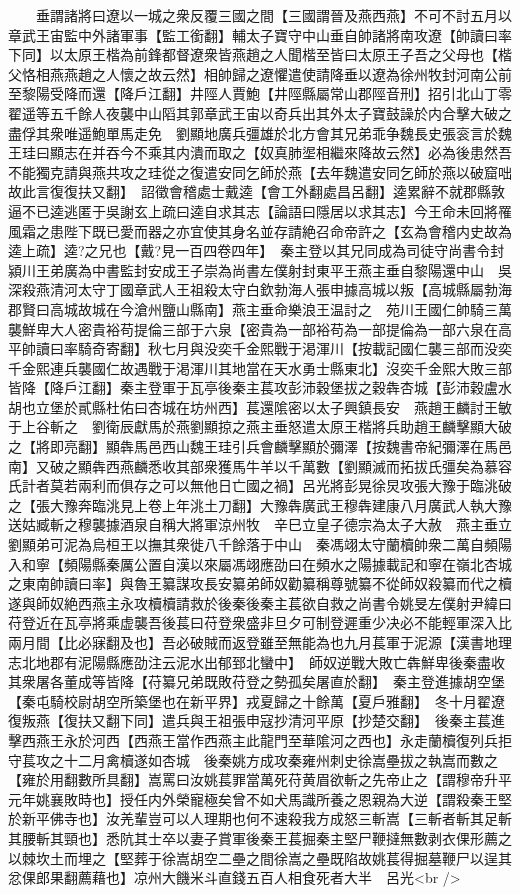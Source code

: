 　　垂謂諸將曰遼以一城之衆反覆三國之間【三國謂晉及燕西燕】不可不討五月以章武王宙監中外諸軍事【監工銜翻】輔太子寶守中山垂自帥諸將南攻遼【帥讀曰率下同】以太原王楷為前鋒都督遼衆皆燕趙之人聞楷至皆曰太原王子吾之父母也【楷父恪相燕燕趙之人懷之故云然】相帥歸之遼懼遣使請降垂以遼為徐州牧封河南公前至黎陽受降而還【降戶江翻】井陘人賈鮑【井陘縣屬常山郡陘音刑】招引北山丁零翟遥等五千餘人夜襲中山䧟其郭章武王宙以奇兵出其外太子寶鼓譟於内合擊大破之盡俘其衆唯遥鮑單馬走免　劉顯地廣兵彊雄於北方會其兄弟乖争魏長史張衮言於魏王珪曰顯志在并吞今不乘其内潰而取之【奴真肺埿相繼來降故云然】必為後患然吾不能獨克請與燕共攻之珪從之復遣安同乞師於燕【去年魏遣安同乞師於燕以破窟咄故此言復復扶又翻】　詔徵會稽處士戴逵【會工外翻處昌呂翻】逵累辭不就郡縣敦逼不已逵逃匿于吳謝玄上疏曰逵自求其志【論語曰隱居以求其志】今王命未回將罹風霜之患陛下既已愛而器之亦宜使其身名並存請絶召命帝許之【玄為會稽内史故為逵上疏】逵?之兄也【戴?見一百四卷四年】　秦主登以其兄同成為司徒守尚書令封潁川王弟廣為中書監封安成王子崇為尚書左僕射封東平王燕主垂自黎陽還中山　吳深殺燕清河太守丁國章武人王祖殺太守白欽勃海人張申據高城以叛【高城縣屬勃海郡賢曰高城故城在今滄州鹽山縣南】燕主垂命樂浪王温討之　苑川王國仁帥騎三萬襲鮮卑大人密貴裕苟提倫三部于六泉【密貴為一部裕苟為一部提倫為一部六泉在高平帥讀曰率騎奇寄翻】秋七月與没奕千金熙戰于渇渾川【按載記國仁襲三部而没奕千金熙連兵襲國仁故遇戰于渇渾川其地當在天水勇士縣東北】沒奕千金熙大敗三部皆降【降戶江翻】秦主登軍于瓦亭後秦主萇攻彭沛穀堡拔之穀犇杏城【彭沛穀盧水胡也立堡於貳縣杜佑曰杏城在坊州西】萇還隂密以太子興鎮長安　燕趙王麟討王敏于上谷斬之　劉衛辰獻馬於燕劉顯掠之燕主垂怒遣太原王楷將兵助趙王麟擊顯大破之【將即亮翻】顯犇馬邑西山魏王珪引兵會麟擊顯於彌澤【按魏書帝紀彌澤在馬邑南】又破之顯犇西燕麟悉收其部衆獲馬牛羊以千萬數【劉顯滅而拓拔氏彊矣為慕容氏計者莫若兩利而俱存之可以無他日亡國之禍】呂光將彭晃徐炅攻張大豫于臨洮破之【張大豫奔臨洮見上卷上年洮土刀翻】大豫犇廣武王穆犇建康八月廣武人執大豫送姑臧斬之穆襲據酒泉自稱大將軍涼州牧　辛巳立皇子德宗為太子大赦　燕主垂立劉顯弟可泥為烏桓王以撫其衆徙八千餘落于中山　秦馮翊太守蘭櫝帥衆二萬自頻陽入和寧【頻陽縣秦厲公置自漢以來屬馮翊應劭曰在頻水之陽據載記和寧在嶺北杏城之東南帥讀曰率】與魯王纂謀攻長安纂弟師奴勸纂稱尊號纂不從師奴殺纂而代之櫝遂與師奴絶西燕主永攻櫝櫝請救於後秦後秦主萇欲自救之尚書令姚旻左僕射尹緯曰苻登近在瓦亭將乘虚襲吾後萇曰苻登衆盛非旦夕可制登遲重少决必不能輕軍深入比兩月間【比必寐翻及也】吾必破賊而返登雖至無能為也九月萇軍于泥源【漢書地理志北地郡有泥陽縣應劭注云泥水出郁郅北蠻中】　師奴逆戰大敗亡犇鮮卑後秦盡收其衆屠各董成等皆降【苻纂兄弟既敗苻登之勢孤矣屠直於翻】　秦主登進據胡空堡【秦屯騎校尉胡空所築堡也在新平界】戎夏歸之十餘萬【夏戶雅翻】　冬十月翟遼復叛燕【復扶又翻下同】遣兵與王祖張申寇抄清河平原【抄楚交翻】　後秦主萇進擊西燕王永於河西【西燕王當作西燕主此龍門至華隂河之西也】永走蘭櫝復列兵拒守萇攻之十二月禽櫝遂如杏城　後秦姚方成攻秦雍州刺史徐嵩壘拔之執嵩而數之【雍於用翻數所具翻】嵩罵曰汝姚萇罪當萬死苻黄眉欲斬之先帝止之【謂穆帝升平元年姚襄敗時也】授任内外榮寵極矣曾不如犬馬識所養之恩親為大逆【謂殺秦王堅於新平佛寺也】汝羌輩豈可以人理期也何不速殺我方成怒三斬嵩【三斬者斬其足斬其腰斬其頸也】悉阬其士卒以妻子賞軍後秦王萇掘秦主堅尸鞭撻無數剥衣倮形薦之以棘坎土而埋之【堅葬于徐嵩胡空二壘之間徐嵩之壘既陷故姚萇得掘墓鞭尸以逞其忿倮郎果翻薦藉也】凉州大饑米斗直錢五百人相食死者大半　呂光<br />
